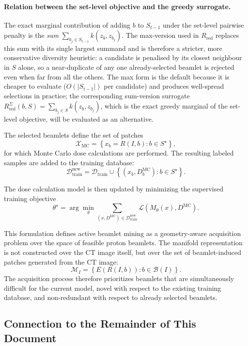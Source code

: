 \documentclass[11pt,a4paper]{article}
\begin{document}
\paragraph{Relation between the set-level objective and the greedy surrogate.}
The exact marginal contribution of adding \(b\) to \(S_{t-1}\) under the
set-level pairwise penalty is the \emph{sum}
\(\sum_{b_j \in S_{t-1}} k(z_b, z_{b_j})\).  The max-version used in
\(R_{\mathrm{red}}\) replaces this sum with its single largest summand and
is therefore a stricter, more conservative diversity heuristic: a candidate
is penalised by its closest neighbour in \(S\) alone, so a near-duplicate
of any one already-selected beamlet is rejected even when far from all the
others.  The max form is the default because it is cheaper to evaluate
(\(O(|S_{t-1}|)\) per candidate) and produces well-spread selections in
practice; the corresponding sum-version surrogate
\(R_{\mathrm{red}}^{\Sigma}(b, S) = \sum_{b_j \in S} k(z_b, z_{b_j})\),
which is the exact greedy marginal of the set-level objective, will be
evaluated as an alternative.

The selected beamlets define the set of patches
\[
\mathcal{X}_{\mathrm{MC}}
=
\left\{
x_b = R(I,b) : b \in S^\star
\right\},
\]
for which Monte Carlo dose calculations are performed. The resulting labeled
samples are added to the training database:
\[
\mathcal{D}_{\mathrm{train}}^{\mathrm{new}}
=
\mathcal{D}_{\mathrm{train}}
\cup
\left\{
(x_b, D_b^{\mathrm{MC}}) : b \in S^\star
\right\}.
\]

The dose calculation model is then updated by minimizing the supervised training
objective
\[
\theta^\star
=
\arg\min_{\theta}
\sum_{(x,D^{\mathrm{MC}}) \in \mathcal{D}_{\mathrm{train}}^{\mathrm{new}}}
\mathcal{L}
\left(
M_{\theta}(x),
D^{\mathrm{MC}}
\right).
\]

This formulation defines active beamlet mining as a geometry-aware acquisition
problem over the space of feasible proton beamlets. The manifold representation
is not constructed over the CT image itself, but over the set of beamlet-induced
patches generated from the CT image:
\[
\mathcal{M}_I
=
\left\{
E(R(I,b)) : b \in \mathcal{B}(I)
\right\}.
\]
The acquisition process therefore prioritizes beamlets that are simultaneously
difficult for the current model, novel with respect to the existing training
database, and non-redundant with respect to already selected beamlets.

\subsection{Connection to the Remainder of This Document}
\label{sec:framework_to_sobel}
\end{document}
